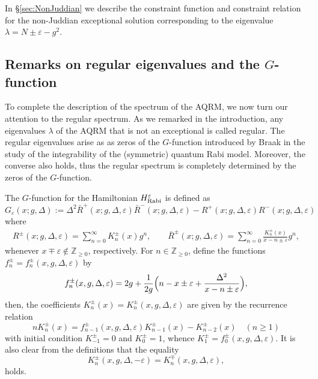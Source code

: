 \documentclass[11pt]{article}
\numberwithin{equation}{section}
\newcommand{\Z}{\mathbb{Z}} %
\newcommand{\e}{\varepsilon}
\newcommand{\HRabi}[1]{H_{\text{\upshape Rabi}}^{#1}} %
\theoremstyle{plain}
\theoremstyle{definition}
\theoremstyle{remark}
\begin{document}
In \S \ref{sec:NonJuddian} we describe the constraint function and constraint relation for the non-Juddian exceptional solution
corresponding to the eigenvalue \(\lambda = N \pm \e - g^2\).


\subsection{Remarks on regular eigenvalues and the \texorpdfstring{$G$}{G}-function} \label{sec:Gfunct}

To complete the description of the spectrum of the AQRM, we now turn our attention to the regular spectrum.
As we remarked in the introduction, any eigenvalues \(\lambda\) of the AQRM that is not an exceptional is called regular.
The regular eigenvalues arise as as zeros of the $G$-function introduced by Braak \cite{B2011PRL} in the study of
the integrability of the (symmetric) quantum Rabi model. Moreover, the converse also holds, thus the regular
spectrum is completely determined by the zeros of the $G$-function.

The \(G\)-function for the Hamiltonian \(\HRabi{\e}\) is defined as
\begin{equation*}
  G_\e(x;g,\Delta) := \Delta^2\bar{R}^+(x;g,\Delta,\e) \bar{R}^-(x;g,\Delta,\e) - R^+(x;g,\Delta,\e)R^-(x;g,\Delta,\e)
\end{equation*}
where
\begin{gather} \label{eq:gfuncR}
  R^\pm(x;g,\Delta,\e) = \sum_{n=0}^\infty K^{\pm}_n(x) g^n,
  \qquad
  \bar{R}^{\pm}(x;g,\Delta,\e) = \sum_{n=0}^\infty \frac{K^{\pm}_n(x)}{x-n\pm \e} g^n,
\end{gather}
whenever $x \mp \e  \not\in\Z_{\geq0} $, respectively. For \(n \in \Z_{\geq 0}\), define the functions \(f^{\pm}_n = f^{\pm}_n(x,g,\Delta,\e)\) by
\begin{equation}\label{eq:fn}
  f^{\pm}_n(x,g,\Delta,\e) = 2g + \frac{1}{2g} \Bigl( n - x \pm \e + \frac{\Delta^2}{x -n \pm \e}  \Bigr),
\end{equation}
then, the coefficients \(K^{\pm}_n(x)=K^{\pm}_n(x,g, \Delta,\e)\) are given by the recurrence relation
\begin{equation}\label{eq:RecursionKn}
 n K^{\pm}_{n}(x) = f^{\pm}_{n-1}(x,g,\Delta,\e) K^{\pm}_{n-1}(x) - K^{\pm}_{n-2}(x) \quad (n\geq1)
\end{equation}
with initial condition \(K_{-1}^{\pm} = 0\) and \(K_0^{\pm} = 1\), whence \(K_1^{\pm}=f_0^{\pm}(x,g,\Delta,\e)\).
It is also clear from the definitions that the equality
\begin{equation}\label{eq:signKpm}
  K^{\pm}_n(x,g, \Delta,-\e) =K^{\mp}_n(x,g, \Delta,\e),
\end{equation}
holds.
\end{document}
